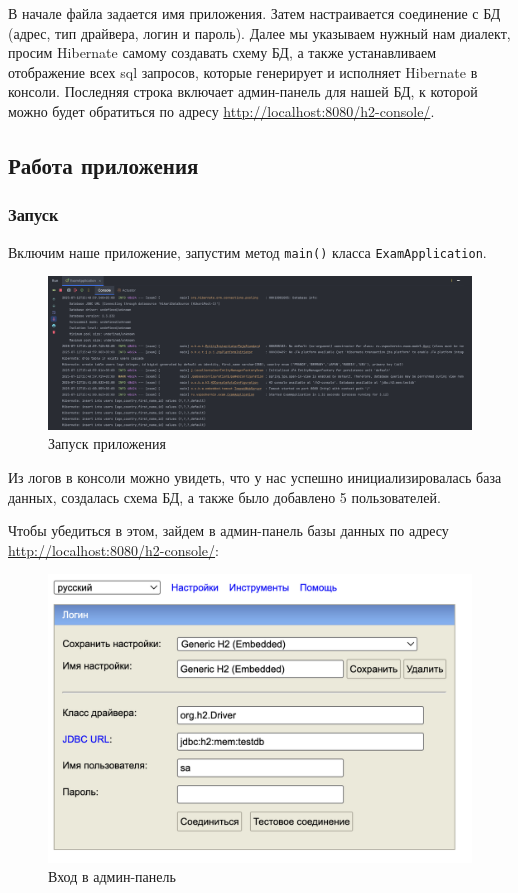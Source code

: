 \documentclass[a4paper, 14pt]{article}
\begin{document}
В начале файла задается имя приложения. Затем настраивается соединение с БД (адрес, тип драйвера, логин и пароль). Далее мы указываем нужный нам диалект, просим Hibernate самому создавать схему БД, а также устанавливаем отображение всех sql запросов, которые генерирует и исполняет Hibernate в консоли. Последняя строка включает админ-панель для нашей БД, к которой можно будет обратиться по адресу \url{http://localhost:8080/h2-console/}.

\subsection{Работа приложения}

\subsubsection{Запуск}

Включим наше приложение, запустим метод \texttt{main()} класса \texttt{ExamApplication}.

\begin{figure}[H]
	\centering
	\includegraphics[width=17cm]{resources/2.png}
	\caption{Запуск приложения}
\end{figure}

Из логов в консоли можно увидеть, что у нас успешно инициализировалась база данных, создалась схема БД, а также было добавлено 5 пользователей.

Чтобы убедиться в этом, зайдем в админ-панель базы данных по адресу \url{http://localhost:8080/h2-console/}:

\begin{figure}[H]
	\centering
	\includegraphics[width=17cm]{resources/3.png}
	\caption{Вход в админ-панель}
\end{figure}
\end{document}
